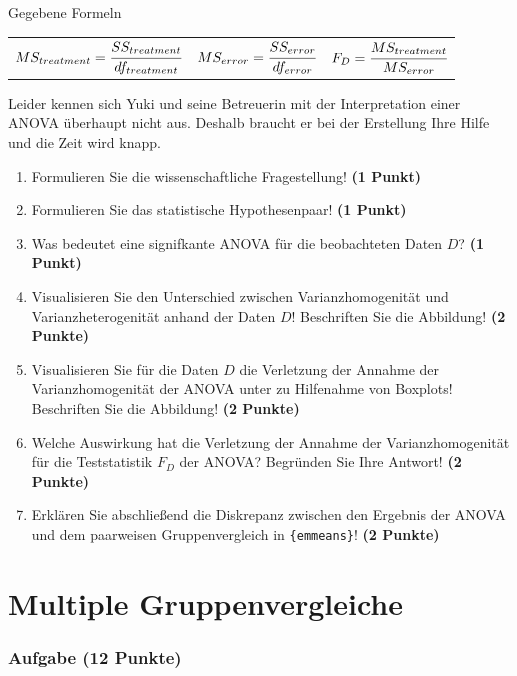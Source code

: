 \documentclass[a4paper, 9pt]{scrartcl}\usepackage[]{graphicx}\usepackage[]{xcolor}
\begin{document}
\begin{graybox}{Gegebene Formeln}
\begin{center}
  \begin{tabular}{ccc}
    $MS_{treatment} = \cfrac{SS_{treatment}}{df_{treatment}}$ &
    $MS_{error} = \cfrac{SS_{error}}{df_{error}}$ &
    $F_{D} = \cfrac{MS_{treatment}}{MS_{error}}$ \\
  \end{tabular}
\end{center}
\end{graybox}

Leider kennen sich Yuki und seine Betreuerin mit der Interpretation einer ANOVA überhaupt nicht aus. Deshalb braucht er bei der Erstellung Ihre Hilfe und die Zeit wird knapp. 

\begin{enumerate}
  \item Formulieren Sie die wissenschaftliche Fragestellung! \textbf{(1 Punkt)}
  \item Formulieren Sie das statistische Hypothesenpaar! \textbf{(1 Punkt)}
\item Was bedeutet eine signifkante ANOVA für die beobachteten Daten $D$? \textbf{(1 Punkt)}
\item Visualisieren Sie den Unterschied zwischen Varianzhomogenität und Varianzheterogenität anhand der Daten $D$! Beschriften Sie die Abbildung! \textbf{(2 Punkte)} 
\item Visualisieren Sie für die Daten $D$ die Verletzung der Annahme der Varianzhomogenität der ANOVA unter zu Hilfenahme von Boxplots! Beschriften Sie die Abbildung! \textbf{(2 Punkte)}
\item Welche Auswirkung hat die Verletzung der Annahme der Varianzhomogenität für die Teststatistik $F_D$ der ANOVA? Begründen Sie Ihre Antwort! \textbf{(2 Punkte)}
\item Erklären Sie abschließend die Diskrepanz zwischen den Ergebnis der ANOVA und dem paarweisen Gruppenvergleich in \texttt{\{emmeans\}}! \textbf{(2 Punkte)}
\end{enumerate}

 
\clearpage
\part{Multiple Gruppenvergleiche}

\section{Aufgabe \hfill (12 Punkte)}
\end{document}
